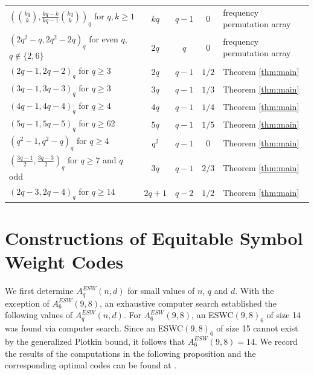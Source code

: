 \documentclass[draft, 11pt]{article}
\begin{document}
\begin{landscape}
\begin{table}
\begin{tabular}{p{8cm}cccp{37mm}}
$({kq\choose k},\frac{kq-k}{kq-1}{kq\choose k})_q$ for  $q,k\ge 1$ &
$kq$ & $q-1$ & 0 &frequency permutation array\cite{Huczynska:2010}\\

$(2q^2-q,2q^2-2q)_q$ for even $q$, $q\notin\{2,6\}$ &
$2q$ & $q$ & 0 & frequency permutation array\cite{Huczynska:2010}\\ \hline


$(2q-1,2q-2)_q$ for $q\ge 3$ &
$2q$ & $q-1$ & $1/2$ & Theorem \ref{thm:main}\\


$(3q-1,3q-3)_q$ for $q\ge 3$ &
$3q$ & $q-1$ & $1/3$ & Theorem \ref{thm:main}\\

$(4q-1,4q-4)_q$ for $q\ge 4$ &
$4q$ & $q-1$ & $1/4$ & Theorem \ref{thm:main}\\

$(5q-1,5q-5)_q$ for $q\ge 62$ &
$5q$ & $q-1$ & $1/5$ & Theorem \ref{thm:main}\\

$(q^2-1,q^2-q)_q$ for $q\ge 4$ &
$q^2$ & $q-1$ & $0$ & Theorem \ref{thm:main}\\

$\left(\frac {3q-1}{2},\frac{3q-3}{2}\right)_q$ for $q\ge 7$ and $q$ odd &
$3q$ & $q-1$ & $2/3$ & Theorem \ref{thm:main}\\

$(2q-3,2q-4)_q$ for $q\ge 14$ &
$2q+1$ & $q-2$ & $1/2$ & Theorem \ref{thm:main}\\


\hline
\end{tabular}
\end{table}
\end{landscape}

 \section{Constructions of Equitable Symbol Weight Codes}

We first determine  $A_q^{ESW}(n,d)$ for small values of $n$, $q$ and $d$.
With the exception of $A_6^{ESW}(9,8)$, an exhaustive computer search
established the following values of $A_q^{ESW}(n,d)$. 
For $A_6^{ESW}(9,8)$,
an ESWC$(9,8)_6$ of size 14 was found via computer search.
Since an ESWC$(9,8)_6$ of size 15 cannot exist by
the generalized Plotkin bound, it follows that $A_6^{ESW}(9,8)=14$.
We record the results of the computations in the following proposition
and the corresponding optimal codes can be found at
\cite{Cheeetal:2012online}.
\end{document}
